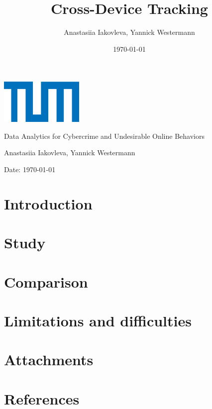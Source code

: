 \documentclass{article}
\title{Cross-Device Tracking}
\author{Anastasiia Iakovleva, Yannick Westermann}
\date{\today}
\renewcommand\maketitle{
  \begin{titlepage}
    \centering
    \includegraphics[width=0.3\textwidth]{./assets/tum-logo.png} 
    \vspace{1cm}

    \Large
    Data Analytics for Cybercrime and Undesirable Online Behaviors
    \vspace{2cm}

    \Huge
    \thetitle{}
    \vspace{2cm}

    \Large
    Anastasiia Iakovleva, Yannick Westermann
    \vspace{1cm}

    \normalsize
    Date: \today
    \vspace{1cm}

    \begin{abstract}
        \lipsum[1]
    \end{abstract}
  \end{titlepage}
}
\begin{document}
\maketitle

\newpage
\tableofcontents
\newpage

\section{Introduction}\label{sec:introduction}


\section{Study}\label{sec:methodology}


\section{Comparison}\label{sec:results}


\section{Limitations and difficulties}\label{sec:conclusion}


\section{Attachments}\label{sec:attachments}


\section{References}\label{sec:references}

\end{document}
